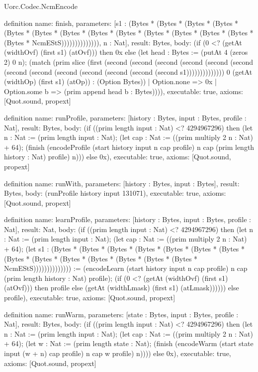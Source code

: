 \begin{lexlean}{Uorc.Codec.NcmEncode}
\begin{semanticmodule}
definition{
  name: finish,
  parameters: [s1 : (Bytes * (Bytes * (Bytes * (Bytes * (Bytes * (Bytes * (Bytes * (Bytes * (Bytes * (Bytes * (Bytes * (Bytes * (Bytes * (Bytes * NcmEStS)))))))))))))), n : Nat],
  result: Bytes,
  body: (if (0 <? (getAt (widthOvf) (first s1) (atOvf))) then 0x else (let head : Bytes := (putAt 4 (zeros 2) 0 n); (match (prim slice (first (second (second (second (second (second (second (second (second (second (second (second (second (second s1)))))))))))))) 0 (getAt (widthOp) (first s1) (atOp)) : (Option Bytes))
    | Option.none => 0x
    | Option.some b => (prim append head b : Bytes)))),
  executable: true,
  axioms: [Quot.sound, propext]
}

definition{
  name: runProfile,
  parameters: [history : Bytes, input : Bytes, profile : Nat],
  result: Bytes,
  body: (if ((prim length input : Nat) <? 4294967296) then (let n : Nat := (prim length input : Nat); (let cap : Nat := ((prim multiply 2 n : Nat) + 64); (finish (encodeProfile (start history input n cap profile) n cap (prim length history : Nat) profile) n))) else 0x),
  executable: true,
  axioms: [Quot.sound, propext]
}

definition{
  name: runWith,
  parameters: [history : Bytes, input : Bytes],
  result: Bytes,
  body: (runProfile history input 131071),
  executable: true,
  axioms: [Quot.sound, propext]
}

definition{
  name: learnProfile,
  parameters: [history : Bytes, input : Bytes, profile : Nat],
  result: Nat,
  body: (if ((prim length input : Nat) <? 4294967296) then (let n : Nat := (prim length input : Nat); (let cap : Nat := ((prim multiply 2 n : Nat) + 64); (let s1 : (Bytes * (Bytes * (Bytes * (Bytes * (Bytes * (Bytes * (Bytes * (Bytes * (Bytes * (Bytes * (Bytes * (Bytes * (Bytes * (Bytes * NcmEStS)))))))))))))) := (encodeLearn (start history input n cap profile) n cap (prim length history : Nat) profile); (if (0 <? (getAt (widthOvf) (first s1) (atOvf))) then profile else (getAt (widthLmask) (first s1) (atLmask)))))) else profile),
  executable: true,
  axioms: [Quot.sound, propext]
}

definition{
  name: runWarm,
  parameters: [state : Bytes, input : Bytes, profile : Nat],
  result: Bytes,
  body: (if ((prim length input : Nat) <? 4294967296) then (let n : Nat := (prim length input : Nat); (let cap : Nat := ((prim multiply 2 n : Nat) + 64); (let w : Nat := (prim length state : Nat); (finish (encodeWarm (start state input (w + n) cap profile) n cap w profile) n)))) else 0x),
  executable: true,
  axioms: [Quot.sound, propext]
}


\end{semanticmodule}
\end{lexlean}
